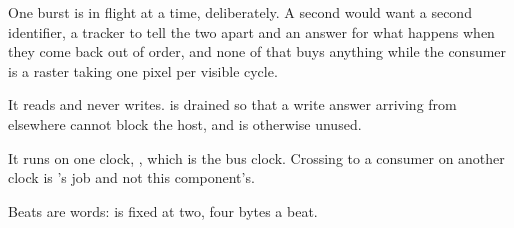 One burst is in flight at a time, deliberately. A second would want a
second identifier, a tracker to tell the two apart and an answer for
what happens when they come back out of order, and none of that buys
anything while the consumer is a raster taking one pixel per visible
cycle.

It reads and never writes.  is drained so that a write
answer arriving from elsewhere cannot block the host, and is
otherwise unused.

It runs on one clock, , which is the bus clock.
Crossing to a consumer on another clock is 's job and
not this component's.

Beats are words:  is fixed at two, four bytes a beat.
